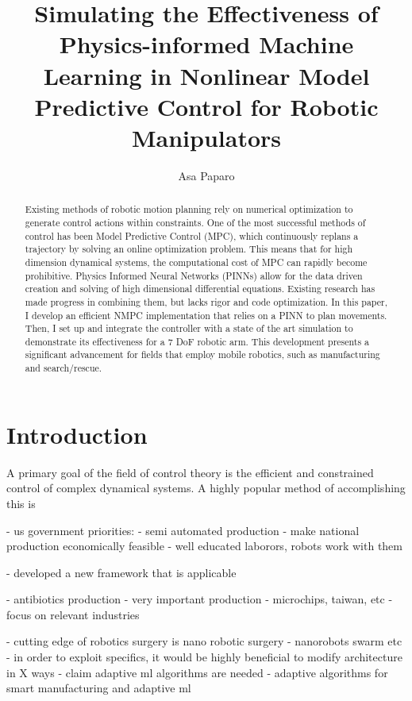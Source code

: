 \documentclass[11pt, titlepage]{article}
\title{Simulating the Effectiveness of Physics-informed Machine Learning in Nonlinear Model Predictive Control for Robotic Manipulators}
\author{Asa Paparo}
\date{}
\begin{document}
\maketitle

\begin{abstract}

Existing methods of robotic motion planning rely on numerical optimization to generate control actions within constraints. One of the most successful methods of control has been Model Predictive Control (MPC), which continuously replans a trajectory by solving an online optimization problem. This means that for high dimension dynamical systems, the computational cost of MPC can rapidly become prohibitive. Physics Informed Neural Networks (PINNs) allow for the data driven creation and solving of high dimensional differential equations. Existing research has made progress in combining them, but lacks rigor and code optimization. In this paper, I develop an efficient NMPC implementation that relies on a PINN to plan movements. Then, I set up and integrate the controller with a state of the art simulation to demonstrate its effectiveness for a 7 DoF robotic arm. This development presents a significant advancement for fields that employ mobile robotics, such as manufacturing and search/rescue.
\end{abstract}

\section{Introduction}

A primary goal of the field of control theory is the efficient and constrained control of complex dynamical systems. A highly popular method of accomplishing this is \cite{mpc_industry}

\cite{youm2023imitating}

    - us government priorities:
    - semi automated production
    - make national production economically feasible
    - well educated laborors, robots work with them

    - developed a new framework that is applicable
    
    - antibiotics production
    - very important production
    - microchips, taiwan, etc
    - focus on relevant industries

    - cutting edge of robotics surgery is nano robotic surgery
    - nanorobots swarm etc
    - in order to exploit specifics, it would be highly beneficial to modify architecture in X ways
    - claim adaptive ml algorithms are needed
    - adaptive algorithms for smart manufacturing and adaptive ml
\end{document}
